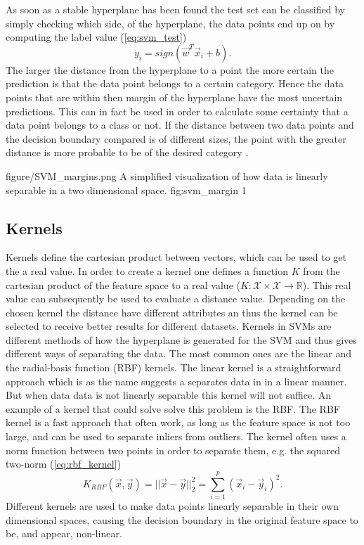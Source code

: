 As soon as a stable hyperplane has been found the test set can be classified by simply checking which side, of the hyperplane, the data points end up on by computing the label value (\ref{eq:svm_test})
\begin{equation}
\label{eq:svm_test}
y_i = sign\left(\vec{w}^T\vec{x}_i+b\right).
\end{equation}
The larger the distance from the hyperplane to a point the more certain the prediction is that the data point belongs to a certain category. Hence the data points that are within then margin of the hyperplane have the most uncertain predictions. This can in fact be used in order to calculate some certainty that a data point belongs to a class or not. If the distance between two data points and the decision boundary compared is of different sizes, the point with the greater distance is more probable to be of the desired category \cite{tong2001support}. 


\singlefigure
{figure/SVM_margins.png}
{A simplified visualization of how data is linearly separable in a two dimensional space.}
{fig:svm_margin}
{1}


\subsection{Kernels}

Kernels define the cartesian product between vectors, which can be used to get the a real value. In order to create a kernel one defines a function $K$ from the cartesian product of the feature space to a real value ($K:\mathcal{X}\times \mathcal{X} \rightarrow \mathbb{R}$). This real value can subsequently be used to evaluate a distance value. Depending on the chosen kernel the distance have different attributes an thus the kernel can be selected to receive better results for different datasets.
Kernels in SVMs are different methods of how the hyperplane is generated for the SVM and thus gives different ways of separating the data.  The most common ones are the linear and the radial-basis function (RBF) kernels. The linear kernel is a straightforward approach which is as the name suggests a separates data in in a linear manner. 
But when data data is not linearly separable this kernel will not suffice. 
An example of a kernel that could solve solve this problem is the RBF. The RBF kernel is a fast approach that often work, as long as the feature space is not too large, and can be used to separate inliers from outliers. The kernel often uses a norm function between two points in order to separate them, e.g. the squared two-norm  (\ref{eq:rbf_kernel})
\begin{equation}
\label{eq:rbf_kernel}
K_{RBF}(\vec{x},\vec{y}) = ||\vec{x}-\vec{y}||_2 ^2=\sum_{i=1}^p  (\vec{x}_i-\vec{y}_i)^2.
\end{equation}
Different kernels are used to make data points linearly separable in their own dimensional spaces, causing the decision boundary in the original feature space to be, and appear, non-linear.
